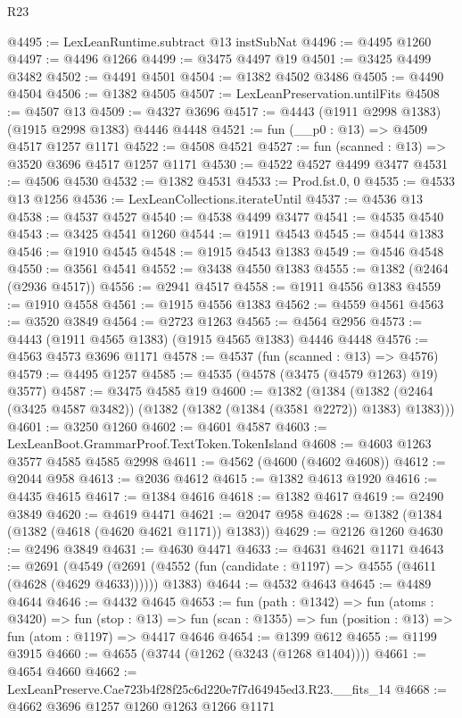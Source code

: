 \begin{lexlean}{R23}
\begin{coremodule}
@4495 := LexLeanRuntime.subtract @13 instSubNat
@4496 := @4495 @1260
@4497 := @4496 @1266
@4499 := @3475 @4497 @19
@4501 := @3425 @4499 @3482
@4502 := @4491 @4501
@4504 := @1382 @4502 @3486
@4505 := @4490 @4504
@4506 := @1382 @4505
@4507 := LexLeanPreservation.untilFits
@4508 := @4507 @13
@4509 := @4327 @3696
@4517 := @4443 (@1911 @2998 @1383) (@1915 @2998 @1383) @4446 @4448
@4521 := fun (__p0 : @13) => @4509 @4517 @1257 @1171
@4522 := @4508 @4521
@4527 := fun (scanned : @13) => @3520 @3696 @4517 @1257 @1171
@4530 := @4522 @4527 @4499 @3477
@4531 := @4506 @4530
@4532 := @1382 @4531
@4533 := Prod.fst.{0, 0}
@4535 := @4533 @13 @1256
@4536 := LexLeanCollections.iterateUntil
@4537 := @4536 @13
@4538 := @4537 @4527
@4540 := @4538 @4499 @3477
@4541 := @4535 @4540
@4543 := @3425 @4541 @1260
@4544 := @1911 @4543
@4545 := @4544 @1383
@4546 := @1910 @4545
@4548 := @1915 @4543 @1383
@4549 := @4546 @4548
@4550 := @3561 @4541
@4552 := @3438 @4550 @1383
@4555 := @1382 (@2464 (@2936 @4517))
@4556 := @2941 @4517
@4558 := @1911 @4556 @1383
@4559 := @1910 @4558
@4561 := @1915 @4556 @1383
@4562 := @4559 @4561
@4563 := @3520 @3849
@4564 := @2723 @1263
@4565 := @4564 @2956
@4573 := @4443 (@1911 @4565 @1383) (@1915 @4565 @1383) @4446 @4448
@4576 := @4563 @4573 @3696 @1171
@4578 := @4537 (fun (scanned : @13) => @4576)
@4579 := @4495 @1257
@4585 := @4535 (@4578 (@3475 (@4579 @1263) @19) @3577)
@4587 := @3475 @4585 @19
@4600 := @1382
    (@1384 (@1382 (@2464 (@3425 @4587 @3482)) (@1382 (@1382 (@1384 (@3581 @2272)) @1383) @1383)))
@4601 := @3250 @1260
@4602 := @4601 @4587
@4603 := LexLeanBoot.GrammarProof.TextToken.TokenIsland
@4608 := @4603 @1263 @3577 @4585 @4585 @2998
@4611 := @4562 (@4600 (@4602 @4608))
@4612 := @2044 @958
@4613 := @2036 @4612
@4615 := @1382 @4613 @1920
@4616 := @4435 @4615
@4617 := @1384 @4616
@4618 := @1382 @4617
@4619 := @2490 @3849
@4620 := @4619 @4471
@4621 := @2047 @958
@4628 := @1382 (@1384 (@1382 (@4618 (@4620 @4621 @1171)) @1383))
@4629 := @2126 @1260
@4630 := @2496 @3849
@4631 := @4630 @4471
@4633 := @4631 @4621 @1171
@4643 := @2691
    (@4549 (@2691 (@4552 (fun (candidate : @1197) => @4555 (@4611 (@4628 (@4629 @4633)))))) @1383)
@4644 := @4532 @4643
@4645 := @4489 @4644
@4646 := @4432 @4645
@4653 := fun (path : @1342) =>
  fun (atoms : @3420) =>
  fun (stop : @13) =>
  fun (scan : @1355) => fun (position : @13) => fun (atom : @1197) => @4417 @4646
@4654 := @1399 @612
@4655 := @1199 @3915
@4660 := @4655 (@3744 (@1262 (@3243 (@1268 @1404))))
@4661 := @4654 @4660
@4662 := LexLeanPreserve.Cae723b4f28f25c6d220e7f7d64945ed3.R23.__fits_14
@4668 := @4662 @3696 @1257 @1260 @1263 @1266 @1171

\end{coremodule}
\end{lexlean}
